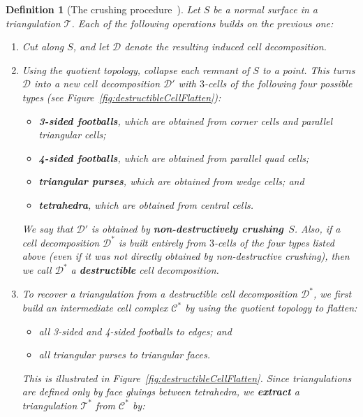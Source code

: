 \documentclass[10pt,a4paper]{amsart}
\newtheorem{definition}[theorem]{Definition}
\newcommand{\tri}{\mathcal{T}}
\begin{document}
\begin{definition}[The crushing procedure~{\cite[Definition~1]{burton2014crushing}}]\label{defs:stages}
Let $S$ be a normal surface in a triangulation $\tri$.
Each of the following operations builds on the previous one:
\begin{enumerate}
    \item Cut along $S$, and let $\mathcal{D}$ denote the resulting induced cell decomposition.
    \item Using the quotient topology, collapse each remnant of $S$ to a point.
    This turns $\mathcal{D}$ into a new cell decomposition $\mathcal{D}'$
    with $3$-cells of the following four possible types
    (see Figure~\ref{fig:destructibleCellFlatten}):
    \begin{itemize}
        \item \textbf{3-sided footballs}, which are obtained from
        corner cells and parallel triangular cells;
        \item \textbf{4-sided footballs}, which are obtained from parallel quad cells;
        \item \textbf{triangular purses}, which are obtained from wedge cells; and
        \item \textbf{tetrahedra}, which are obtained from central cells.
    \end{itemize}
    We say that $\mathcal{D}'$ is obtained by \textbf{non-destructively crushing}~$S$.
    Also, if a cell decomposition $\mathcal{D}^\ast$ is built entirely from $3$-cells of the four types listed above
    (even if it was not directly obtained by non-destructive crushing),
    then we call $\mathcal{D}^\ast$ a \textbf{destructible} cell decomposition.
    \item\label{step:flatten} To recover a triangulation from a destructible cell decomposition $\mathcal{D}^\ast$,
    we first build an intermediate cell complex $\mathcal{C}^\ast$ by using the quotient topology to flatten:
    \begin{itemize}
        \item all 3-sided and 4-sided footballs to edges; and
        \item all triangular purses to triangular faces.
    \end{itemize}
    This is illustrated in Figure~\ref{fig:destructibleCellFlatten}.
    Since triangulations are defined only by face gluings between tetrahedra,
    we \textbf{extract} a triangulation $\tri^\ast$ from $\mathcal{C}^\ast$ by:
    \begin{itemize}

\end{itemize}
\end{enumerate}
\end{definition}
\end{document}
